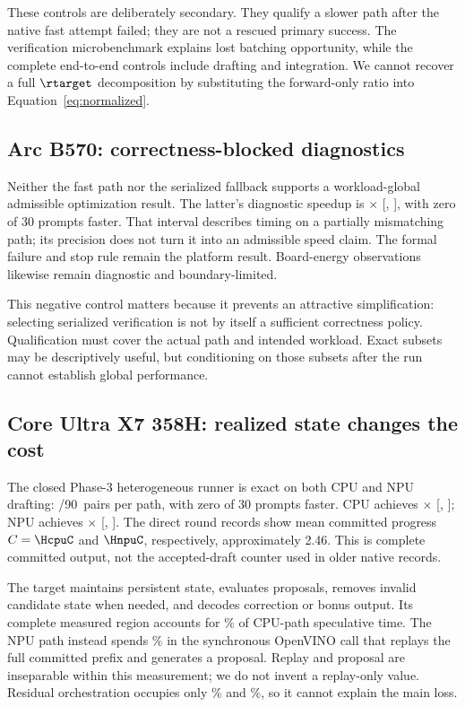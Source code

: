 These controls are deliberately secondary. They qualify a slower path after the native fast attempt failed; they are not a rescued primary success. The verification microbenchmark explains lost batching opportunity, while the complete end-to-end controls include drafting and integration. We cannot recover a full $\rtarget$ decomposition by substituting the forward-only ratio into Equation~\ref{eq:normalized}.

\subsection{Arc B570: correctness-blocked diagnostics}
Neither the fast path nor the serialized fallback supports a workload-global admissible optimization result. The latter's diagnostic speedup is \BSpeed$\times$ [\BLo, \BHi], with zero of 30 prompts faster. That interval describes timing on a partially mismatching path; its precision does not turn it into an admissible speed claim. The formal failure and stop rule remain the platform result. Board-energy observations likewise remain diagnostic and boundary-limited.

This negative control matters because it prevents an attractive simplification: selecting serialized verification is not by itself a sufficient correctness policy. Qualification must cover the actual path and intended workload. Exact subsets may be descriptively useful, but conditioning on those subsets after the run cannot establish global performance.

\subsection{Core Ultra X7 358H: realized state changes the cost}

The closed Phase-3 heterogeneous runner is exact on both CPU and NPU drafting: \HExact/90\ pairs per path, with zero of 30 prompts faster. CPU achieves \HcpuSpeed$\times$ [\HcpuLo, \HcpuHi]; NPU achieves \HnpuSpeed$\times$ [\HnpuLo, \HnpuHi]. The direct round records show mean committed progress $C=\HcpuC$ and $\HnpuC$, respectively, approximately 2.46. This is complete committed output, not the accepted-draft counter used in older native records.

The target maintains persistent state, evaluates proposals, removes invalid candidate state when needed, and decodes correction or bonus output. Its complete measured region accounts for \HcpuTarget\% of CPU-path speculative time. The NPU path instead spends \HnpuDraft\% in the synchronous OpenVINO call that replays the full committed prefix and generates a proposal. Replay and proposal are inseparable within this measurement; we do not invent a replay-only value. Residual orchestration occupies only \HcpuResidual\% and \HnpuResidual\%, so it cannot explain the main loss.

